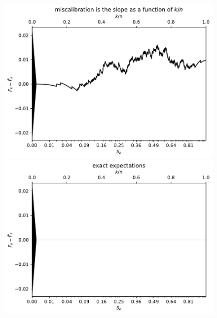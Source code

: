 \documentclass{article}
\begin{document}
\begin{figure}
\begin{centering}

\parbox{\imsize}{\includegraphics[width=\imsize]
                {./codes/unweighted/1000_10_1_3/cumulative.pdf}}
\quad\quad
\parbox{\imsize}{\includegraphics[width=\imsize]
                {./codes/unweighted/1000_10_1_3/cumulative_exact.pdf}}

\vspace{\vertsep}


\end{centering}
\end{figure}
\end{document}
